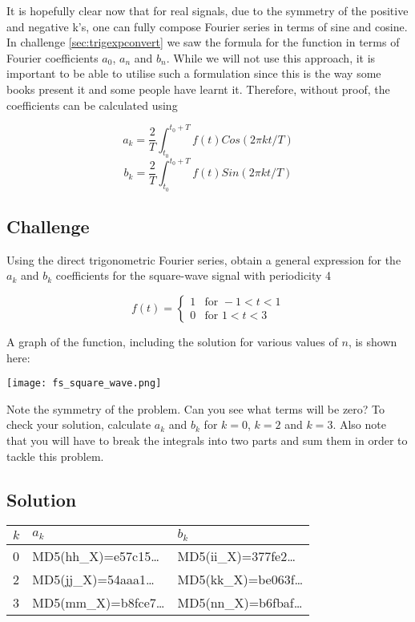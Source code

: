 It is hopefully clear now that for real signals, due to the symmetry of the positive and negative k's, one can fully compose Fourier series in terms of sine and cosine. In challenge \ref{sec:trigexpconvert} we saw the formula for the function in terms of Fourier coefficients $a_0$, $a_n$ and $b_n$. While we will not use this approach, it is important to be able to utilise such a formulation since this is the way some books present it and some people have learnt it. Therefore, without proof, the coefficients can be calculated using

\begin{equation}
    a_k = \frac{2}{T} \int_{t_0}^{t_0+T} f(t) Cos(2 \pi k t/T)
\end{equation}
\begin{equation}
    b_k = \frac{2}{T} \int_{t_0}^{t_0+T} f(t) Sin(2 \pi k t/T)
\end{equation}

\subsection*{Challenge}
Using the direct trigonometric Fourier series, obtain a general expression for the $a_k$ and $b_k$ coefficients for the square-wave signal with periodicity 4

\begin{equation}
    f(t)=
    \begin{cases}
        1 & \text{for } -1<t<1 \\
        0 & \text{for } 1<t<3
    \end{cases}
\end{equation}

A graph of the function, including the solution for various values of $n$, is shown here:

\texttt{[image: fs\_square\_wave.png]}

Note the symmetry of the problem. Can you see what terms will be zero? To check your solution, calculate $a_k$ and $b_k$ for $k=0$, $k=2$ and $k=3$. Also note that you will have to break the integrals into two parts and sum them in order to tackle this problem.

\subsection*{Solution}
\begin{tabular}{|l|l|l|}
    \hline
    $k$ & $a_k$ & $b_k$ \\
    \hline
    0 & MD5(hh\_X)=e57c15\ldots & MD5(ii\_X)=377fe2\ldots \\
    2 & MD5(jj\_X)=54aaa1\ldots & MD5(kk\_X)=be063f\ldots \\
    3 & MD5(mm\_X)=b8fce7\ldots & MD5(nn\_X)=b6fbaf\ldots \\
    \hline
\end{tabular}




